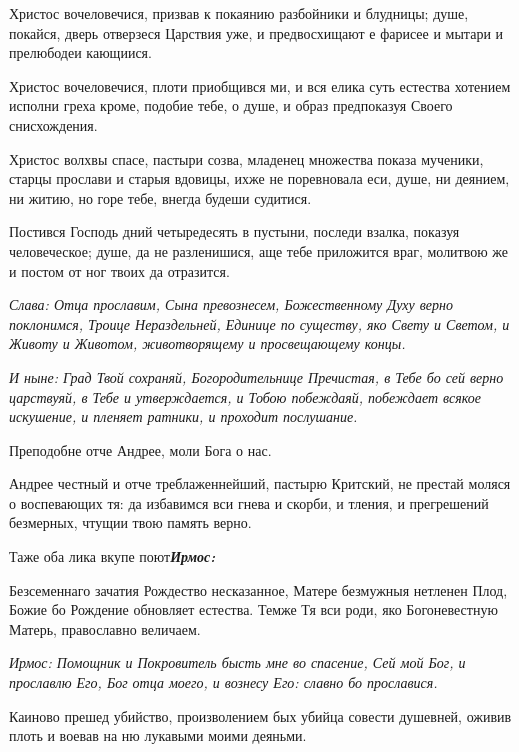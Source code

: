 Христос вочеловечися, призвав к покаянию разбойники и блудницы; душе, покайся, дверь отверзеся Царствия уже, и предвосхищают е фарисее и мытари и прелюбодеи кающиися. 

Христос вочеловечися, плоти приобщився ми, и вся елика суть естества хотением исполни греха кроме, подобие тебе, о душе, и образ предпоказуя Своего снисхождения. 

Христос волхвы спасе, пастыри созва, младенец множества показа мученики, старцы прослави и старыя вдовицы, ихже не поревновала еси, душе, ни деянием, ни житию, но горе тебе, внегда будеши судитися. 

Постився Господь дний четыредесять в пустыни, последи взалка, показуя человеческое; душе, да не разленишися, аще тебе приложится враг, молитвою же и постом от ног твоих да отразится. 

\itshape Слава\normalfont{}: Отца прославим, Сына превознесем, Божественному Духу верно поклонимся, Троице Нераздельней, Единице по существу, яко Свету и Светом, и Животу и Животом, животворящему и просвещающему концы. 

\itshape И ныне\normalfont{}: Град Твой сохраняй, Богородительнице Пречистая, в Тебе бо сей верно царствуяй, в Тебе и утверждается, и Тобою побеждаяй, побеждает всякое искушение, и пленяет ратники, и проходит послушание. 

\bfseries 

Преподобне отче Андрее, моли Бога о нас.

\normalfont{}

Андрее честный и отче треблаженнейший, пастырю Критский, не престай моляся о воспевающих тя: да избавимся вси гнева и скорби, и тления, и прегрешений безмерных, чтущии твою память верно. 

Таже оба лика вкупе поют\bfseries  \normalfont{}\itshape Ирмос: 

\normalfont{}Безсеменнаго зачатия Рождество несказанное, Матере безмужныя нетленен Плод, Божие бо Рождение обновляет естества. Темже Тя вси роди, яко Богоневестную Матерь, православно величаем. \mychapterending

 

\itshape Ирмос\normalfont{}: Помощник и Покровитель бысть мне во спасение, Сей мой Бог, и прославлю Его, Бог отца моего, и вознесу Его: славно бо прославися. 

Каиново прешед убийство, произволением бых убийца совести душевней, оживив плоть и воевав на ню лукавыми моими деяньми. 


